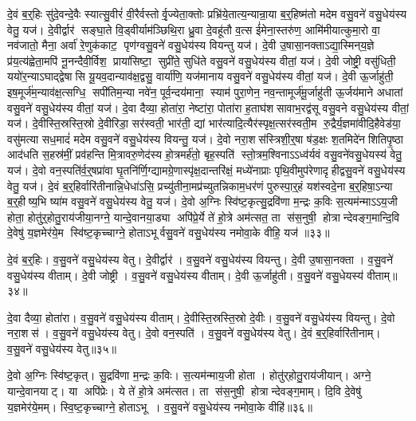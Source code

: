 दे॒वं ब॒र्॒हिः सु॑दे॒वन्दे॒वैः स्यात्सु॒वीरं॑ वी॒रैर्वस्तोर्वृ॒ज्येता॒क्तोः प्रभ्रि॑ये॒तात्य॒न्यान्रा॒या ब॒र्॒हिष्म॑तो मदेम वसु॒वने॑ वसु॒धेय॑स्य वेतु॒ यज॑।
दे॒वीर्द्वार॑ सङ्घा॒ते वि॒ड्वीर्याम॑ञ्छिथि॒रा ध्रु॒वा दे॒वहू॑तौ व॒त्स ई॑मेना॒स्तरु॑ण॒ आमि॑मीयात्कुमा॒रो वा॒ नव॑जातो॒ मैना॒ अर्वा॑ रे॒णुक॑काट॒ पृण॑ग्वसु॒वने॑ वसु॒धेय॑स्य वियन्तु यज॑।
दे॒वी उ॒षासा॒नक्ताऽद्या॒स्मिन्‌य॒ज्ञे प्र॑य॒त्य॑ह्वेता॒मपि॑ नू॒नन्दैवी॒र्विश॒ प्राया॑सिष्टा॒ सुप्री॑ते॒ सुधि॑ते वसु॒वने॑ वसु॒धेय॑स्य वीतां॒ यज॑।
दे॒वी जोष्ट्री॒ वसु॑धिती॒ ययो॑र॒न्याऽघाद्द्वेषासि यू॒यव॒दान्याव॑क्ष॒द्वसु॒ वार्या॑णि॒ यज॑मानाय वसु॒वने॑ वसु॒धेय॑स्य वीतां॒ यज॑।
दे॒वी ऊ॒र्जाहु॑ती॒ इष॒मूर्ज॑म॒न्याव॑क्ष॒त्सग्धि॒ सपी॑तिम॒न्या नवे॑न॒ पूर्व॒न्दय॑माना॒ स्याम॑ पुरा॒णेन॒ नव॒न्तामूर्ज॑मू॒र्जाहु॑ती ऊ॒र्जय॑माने अधातां वसु॒वने॑ वसु॒धेय॑स्य वीतां॒ यज॑।
दे॒वा दैव्या॒ होता॑रा॒ नेष्टा॑रा॒ पोता॑रा ह॒ताघ॑शसावाभ॒रद्व॑सू वसु॒वने वसु॒धेय॑स्य वीतां॒ यज॑।
दे॒वीस्ति॒स्रस्ति॒स्रो दे॒वीरिडा॒ सर॑स्वती॒ भार॑ती॒ द्यां भार॑त्यादि॒त्यैर॑स्पृक्ष॒त्सर॑स्वती॒म रु॒द्रैर्य॒ज्ञमा॑वीदि॒हैवेड॑या॒ वसु॑मत्या सध॒मादं॑ मदेम वसु॒वने॑ वसु॒धेय॑स्य वियन्तु॒ यज॑।
दे॒वो नरा॒शस॑स्त्रिशी॒र्॒षा ष॑ड॒क्षः श॒तमिदे॑नशितिपृ॒ष्ठा आद॑धति स॒हस्र॑मीं॒ प्रव॑हन्ति मि॒त्रावरु॒णेद॑स्य हो॒त्रमर्\mbox{}ह॑तो॒ बृह॒स्पति॑ स्तो॒त्रम॒श्विनाऽऽध्व॑र्यवं वसु॒वने॑वसु॒धेयस्य॑ वेतु॒ यज॑।
दे॒वो वन॒स्पति॑र्व॒र्॒षप्रा॑वा घृ॒तनि॑र्णि॒ग्द्यामग्रे॒णास्पृ॑क्ष॒दान्तरि॑क्षं॒ मध्ये॑नाप्राः पृथि॒वीमुप॑रेणादृहीद्वसु॒वने॑ वसु॒धेय॑स्य वेतु॒ यज॑।
दे॒वं ब॒र्॒हिर्वारि॑तीनान्नि॒धेधा॑ऽसि॒ प्रच्यु॑तीना॒मप्र॑च्युतन्निकाम॒धर॑णं पुरुस्पा॒र्॒हं यश॑स्वदे॒ना ब॒र्॒हिषा॒ऽन्या ब॒र्॒हीष्य॒भि ष्या॑म वसु॒वने॑ वसु॒धेय॑स्य वेतु॒ यज॑।
दे॒वो अ॒ग्निः स्वि॑ष्ट॒कृत्सु॒द्रवि॑णा म॒न्द्रः क॒विः स॒त्यम॑न्माऽऽय॒जी होता॒ होतु॑र्॒होतु॒राय॑जीया॒नग्ने॒ यान्दे॒वानया॒ड्या अपि॑प्रे॒र्ये ते॑ हो॒त्रे अम॑त्सत॒ ता स॑स॒नुषी॒ होत्रान्देवङ्ग॒मान्दि॒वि दे॒वेषु॑ य॒ज्ञमेर॑ये॒म स्वि॑ष्ट॒कृच्चाग्ने॒ होताऽभूर्वसु॒वने॑ वसु॒धेय॑स्य नमोवा॒के वीहि॒ यज॑ ॥३३॥\anuvakamend[यजैकं च]

दे॒वं ब॒र्॒हिः।
व॒सु॒वने॑ वसु॒धेय॑स्य वेतु।
दे॒वीर्द्वार॑।
व॒सु॒वने॑ वसु॒धेय॑स्य वियन्तु।
दे॒वी उ॒षासा॒नक्ता।
व॒सु॒वने॑ वसु॒धेय॑स्य वीताम्।
दे॒वी जोष्ट्री।
व॒सु॒वने॑ वसु॒धेय॑स्य वीताम्।
दे॒वी ऊ॒र्जाहु॑ती।
व॒सु॒वने॑ वसु॒धेयस्य॑ वीताम्॥३४॥

दे॒वा दैव्या॒ होता॑रा।
व॒सु॒वने॑ वसु॒धेय॑स्य वीताम्।
दे॒वीस्ति॒स्रस्ति॒स्रो दे॒वीः।
व॒सु॒वने॑ वसु॒धेय॑स्य वियन्तु।
दे॒वो नरा॒शस॑।
व॒सु॒वने॑ वसु॒धेय॑स्य वेतु।
दे॒वो वन॒स्पति॑।
व॒सु॒वने॑ वसु॒धेय॑स्य वेतु।
दे॒वं ब॒र्॒हिर्वारि॑तीनाम्।
व॒सु॒वने॑ वसु॒धेय॑स्य वेतु॥३५॥

दे॒वो अ॒ग्निः स्वि॑ष्ट॒कृत्।
सु॒द्रवि॑णा म॒न्द्रः क॒विः।
स॒त्यम॑न्माय॒जी होता।
होतु॑र्‌होतु॒राय॑जीयान्।
अग्ने॒ यान्दे॒वानयाट्।
या अपि॑प्रेः।
ये ते॑ हो॒त्रे अम॑त्सत।
ता स॑स॒नुषी॒ होत्रान्देवङ्ग॒माम्।
दि॒वि दे॒वेषु॑ य॒ज्ञमेर॑ये॒मम्।
स्वि॒ष्ट॒कृच्चाग्ने॒ होताऽभू।
व॒सु॒वने॑ वसु॒धेय॑स्य नमोवा॒के वीहि॑॥३६॥\anuvakamend[वी॒तां॒ वे॒त्वभू॒रेकं च]

